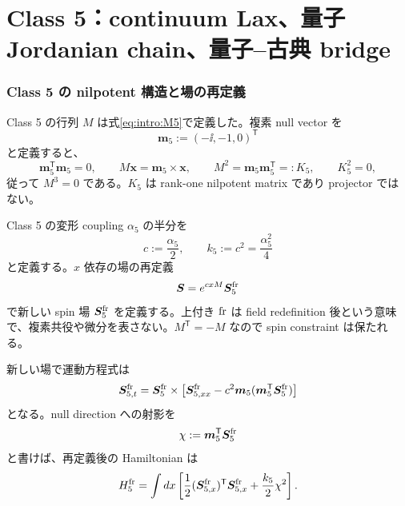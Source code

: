 \part{Class 5：continuum Lax、量子 Jordanian chain、量子--古典 bridge}

\section{Class 5 の nilpotent 構造と場の再定義}
Class 5 の行列 $M$ は式\eqref{eq:intro:M5}で定義した。複素 null vector を
\begin{equation}
\boldsymbol m_5:=(-\ii,-1,0)^{\mathsf T}
\label{eq:m5}
\end{equation}
と定義すると、
\begin{equation}
\boldsymbol m_5^{\mathsf T}\boldsymbol m_5=0,
\qquad M\boldsymbol x=\boldsymbol m_5\times\boldsymbol x,
\qquad M^2=\boldsymbol m_5\boldsymbol m_5^{\mathsf T}=:K_5,
\qquad K_5^2=0,
\label{eq:Mnil}
\end{equation}
従って $M^3=0$ である。$K_5$ は rank-one nilpotent matrix であり projector ではない。

Class 5 の変形 coupling $\alpha_5$ の半分を
\begin{equation}
c:=\frac{\alpha_5}{2},\qquad k_5:=c^2=\frac{\alpha_5^2}{4}
\label{eq:c5}
\end{equation}
と定義する。$x$ 依存の場の再定義
\begin{equation}
\boldsymbol S=e^{cxM}\boldsymbol S_5^{\rm fr}
\label{eq:fieldredef5}
\end{equation}
で新しい spin 場 $\boldsymbol S_5^{\rm fr}$ を定義する。上付き ${\rm fr}$ は field redefinition 後という意味で、複素共役や微分を表さない。$M^{\mathsf T}=-M$ なので spin constraint は保たれる。

新しい場で運動方程式は
\begin{equation}
\boldsymbol S_{5,t}^{\rm fr}
=\boldsymbol S_5^{\rm fr}\times\left[
\boldsymbol S_{5,xx}^{\rm fr}-c^2\boldsymbol m_5(\boldsymbol m_5^{\mathsf T}\boldsymbol S_5^{\rm fr})
\right]
\label{eq:E5fr}
\end{equation}
となる。null direction への射影を
\begin{equation}
\chi:=\boldsymbol m_5^{\mathsf T}\boldsymbol S_5^{\rm fr}
\label{eq:chi}
\end{equation}
と書けば、再定義後の Hamiltonian は
\begin{equation}
H_5^{\rm fr}=\int dx\left[
\frac12(\boldsymbol S_{5,x}^{\rm fr})^{\mathsf T}\boldsymbol S_{5,x}^{\rm fr}
+\frac{k_5}{2}\chi^2\right].
\label{eq:H5fr}
\end{equation}

